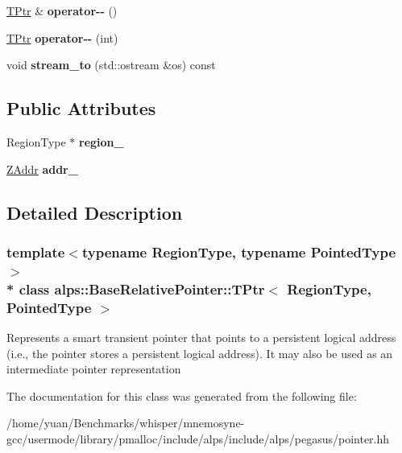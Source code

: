 \begin{DoxyCompactItemize}
\item 
\hyperlink{classalps_1_1BaseRelativePointer_1_1TPtr}{T\+Ptr} \& {\bfseries operator-\/-\/} ()\hypertarget{classalps_1_1BaseRelativePointer_1_1TPtr_aca89e56962abea1463bedd8ee313fc88}{}\label{classalps_1_1BaseRelativePointer_1_1TPtr_aca89e56962abea1463bedd8ee313fc88}

\item 
\hyperlink{classalps_1_1BaseRelativePointer_1_1TPtr}{T\+Ptr} {\bfseries operator-\/-\/} (int)\hypertarget{classalps_1_1BaseRelativePointer_1_1TPtr_a784235665c6d807aff7ef1f5d4fb3a06}{}\label{classalps_1_1BaseRelativePointer_1_1TPtr_a784235665c6d807aff7ef1f5d4fb3a06}

\item 
void {\bfseries stream\+\_\+to} (std\+::ostream \&os) const \hypertarget{classalps_1_1BaseRelativePointer_1_1TPtr_ae92ba13ca2224858d34d3e6260572516}{}\label{classalps_1_1BaseRelativePointer_1_1TPtr_ae92ba13ca2224858d34d3e6260572516}

\end{DoxyCompactItemize}
\subsection*{Public Attributes}
\begin{DoxyCompactItemize}
\item 
Region\+Type $\ast$ {\bfseries region\+\_\+}\hypertarget{classalps_1_1BaseRelativePointer_1_1TPtr_accc8c3485961bad3605d36538de3e40e}{}\label{classalps_1_1BaseRelativePointer_1_1TPtr_accc8c3485961bad3605d36538de3e40e}

\item 
\hyperlink{structalps_1_1ZAddr}{Z\+Addr} {\bfseries addr\+\_\+}\hypertarget{classalps_1_1BaseRelativePointer_1_1TPtr_acaeafb4f8821c6b7ad85fed3de641a42}{}\label{classalps_1_1BaseRelativePointer_1_1TPtr_acaeafb4f8821c6b7ad85fed3de641a42}

\end{DoxyCompactItemize}


\subsection{Detailed Description}
\subsubsection*{template$<$typename Region\+Type, typename Pointed\+Type$>$\\*
class alps\+::\+Base\+Relative\+Pointer\+::\+T\+Ptr$<$ Region\+Type, Pointed\+Type $>$}

Represents a smart transient pointer that points to a persistent logical address (i.\+e., the pointer stores a persistent logical address). It may also be used as an intermediate pointer representation 

The documentation for this class was generated from the following file\+:\begin{DoxyCompactItemize}
\item 
/home/yuan/\+Benchmarks/whisper/mnemosyne-\/gcc/usermode/library/pmalloc/include/alps/include/alps/pegasus/pointer.\+hh\end{DoxyCompactItemize}
